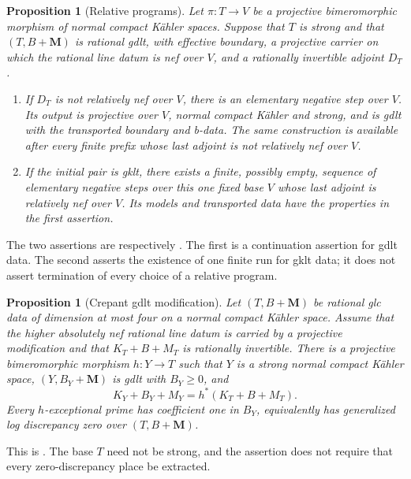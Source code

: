 \documentclass[11pt]{amsart}
\newtheorem{proposition}[theorem]{Proposition}
\theoremstyle{definition}
\theoremstyle{remark}
\numberwithin{equation}{section}
\newcommand{\M}{\mathbf{M}}
\begin{document}
\begin{proposition}[Relative programs]\label{prop:relative-program}
Let \(\pi:T\to V\) be a projective bimeromorphic morphism of normal compact
K\"ahler spaces.  Suppose that \(T\) is strong and that \((T,B+\M)\) is
rational gdlt, with effective boundary, a projective carrier on which the
rational line datum is nef over \(V\), and a rationally invertible adjoint
\(D_T\).
\begin{enumerate}
\item If \(D_T\) is not relatively nef over \(V\), there is an elementary
negative step over \(V\).  Its output is projective over \(V\), normal
compact K\"ahler and strong, and is gdlt with the transported boundary and
b-data.  The same construction is available after every finite prefix whose
last adjoint is not relatively nef over \(V\).
\item If the initial pair is gklt, there exists a finite, possibly empty,
sequence of elementary negative steps over this one fixed base \(V\) whose
last adjoint is relatively nef over \(V\).  Its models and transported data
have the properties in the first assertion.
\end{enumerate}
\end{proposition}

The two assertions are respectively
\cite[Propositions~9.7 and 9.9]{KahlerAuxiliary}.  The first is a
continuation assertion for gdlt data.  The second asserts the existence of
one finite run for gklt data; it does not assert termination of every choice
of a relative program.

\begin{proposition}[Crepant gdlt modification]\label{prop:gdlt-modification}
Let \((T,B+\M)\) be rational glc data of dimension at most four on a normal
compact K\"ahler space.  Assume that the higher absolutely nef rational
line datum is carried by a projective modification and that
\(K_T+B+M_T\) is rationally invertible.  There is a projective bimeromorphic
morphism \(h:Y\to T\) such that \(Y\) is a strong normal compact K\"ahler
space, \((Y,B_Y+\M)\) is gdlt with \(B_Y\geq0\), and
\[
 K_Y+B_Y+M_Y=h^*(K_T+B+M_T).
\]
Every \(h\)-exceptional prime has coefficient one in \(B_Y\), equivalently
has generalized log discrepancy zero over \((T,B+\M)\).
\end{proposition}

This is \cite[Proposition~11.4]{KahlerAuxiliary}.  The base \(T\) need not
be strong, and the assertion does not require that every zero-discrepancy
place be extracted.
\end{document}
